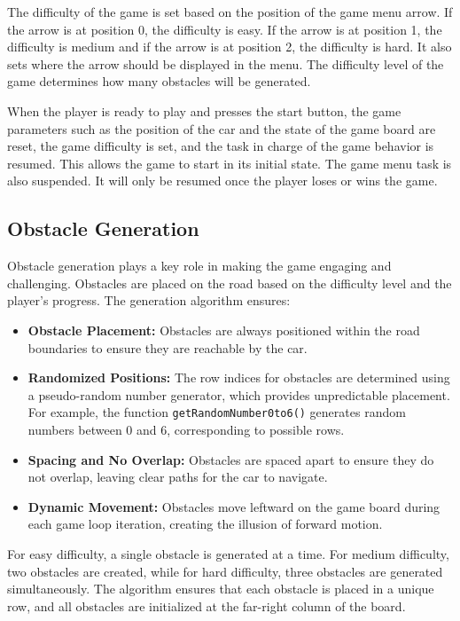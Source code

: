 \documentclass[conference]{IEEEtran}
\begin{document}
The difficulty of the game is set based on the position of the game menu arrow. If the arrow is at position 0, the difficulty is easy. If the arrow is at position 1, the difficulty is medium and if the arrow is at position 2, the difficulty is hard. It also sets where the arrow should be displayed in the menu. The difficulty level of the game determines how many obstacles will be generated.

When the player is ready to play and presses the start button, the game parameters such as the position of the car and the state of the game board are reset, the game difficulty is set, and the task in charge of the game behavior is resumed. This allows the game to start in its initial state. The game menu task is also suspended. It will only be resumed once the player loses or wins the game.

\subsection{Obstacle Generation}  
Obstacle generation plays a key role in making the game engaging and challenging. Obstacles are placed on the road based on the difficulty level and the player’s progress. The generation algorithm ensures:  
\begin{itemize}  
    \item \textbf{Obstacle Placement:} Obstacles are always positioned within the road boundaries to ensure they are reachable by the car.  
    \item \textbf{Randomized Positions:} The row indices for obstacles are determined using a pseudo-random number generator, which provides unpredictable placement. For example, the function \texttt{getRandomNumber0to6()} generates random numbers between 0 and 6, corresponding to possible rows.  
    \item \textbf{Spacing and No Overlap:} Obstacles are spaced apart to ensure they do not overlap, leaving clear paths for the car to navigate.  
    \item \textbf{Dynamic Movement:} Obstacles move leftward on the game board during each game loop iteration, creating the illusion of forward motion.  
\end{itemize}  

For easy difficulty, a single obstacle is generated at a time. For medium difficulty, two obstacles are created, while for hard difficulty, three obstacles are generated simultaneously. The algorithm ensures that each obstacle is placed in a unique row, and all obstacles are initialized at the far-right column of the board.
\end{document}
